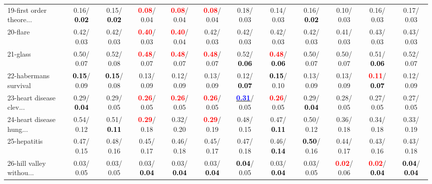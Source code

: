 \begin{table}[h]
\begin{center}
{\begin{tabular}{lc|c|c|c|c|c|c|c|c|c|c}
19-first order theore... &   0.16/\textcolor{black}{\textbf{  0.02}} &   0.15/\textcolor{black}{\textbf{  0.02}} & \textcolor{red}{\textbf{  0.08}}/  0.04 & \textcolor{red}{\textbf{  0.08}}/  0.04 & \textcolor{red}{\textbf{  0.08}}/  0.04 &   0.18/  0.03 &   0.14/  0.03 &   0.16/\textcolor{black}{\textbf{  0.02}} &   0.10/  0.03 &   0.16/  0.03 &   0.17/  0.03 \\
20-flare &   0.42/  0.03 &   0.42/  0.03 & \textcolor{red}{\textbf{  0.40}}/  0.03 & \textcolor{red}{\textbf{  0.40}}/  0.04 &   0.42/  0.03 &   0.42/  0.03 &   0.42/  0.03 &   0.42/  0.03 &   0.41/  0.03 &   0.43/  0.03 &   0.43/  0.03 \\
21-glass &   0.50/  0.07 &   0.52/  0.08 & \textcolor{red}{\textbf{  0.48}}/  0.07 & \textcolor{red}{\textbf{  0.48}}/  0.07 & \textcolor{red}{\textbf{  0.48}}/  0.07 &   0.52/\textcolor{black}{\textbf{  0.06}} & \textcolor{red}{\textbf{  0.48}}/\textcolor{black}{\textbf{  0.06}} &   0.50/  0.07 &   0.50/  0.07 &   0.51/\textcolor{black}{\textbf{  0.06}} &   0.52/  0.07 \\ \hline
22-habermans survival & \textcolor{black}{\textbf{  0.15}}/  0.09 & \textcolor{black}{\textbf{  0.15}}/  0.08 &   0.13/  0.09 &   0.12/  0.09 &   0.13/  0.09 &   0.12/\textcolor{black}{\textbf{  0.07}} & \textcolor{black}{\textbf{  0.15}}/  0.10 &   0.13/  0.09 &   0.13/  0.09 & \textcolor{red}{\textbf{  0.11}}/\textcolor{black}{\textbf{  0.07}} &   0.12/  0.09 \\
23-heart disease clev... &   0.29/\textcolor{black}{\textbf{  0.04}} &   0.29/  0.05 & \textcolor{red}{\textbf{  0.26}}/  0.05 & \textcolor{red}{\textbf{  0.26}}/  0.05 & \textcolor{red}{\textbf{  0.26}}/  0.05 & \underline{\textcolor{blue}{\textbf{  0.31}}}/  0.05 & \textcolor{red}{\textbf{  0.26}}/  0.05 &   0.29/\textcolor{black}{\textbf{  0.04}} &   0.28/  0.05 &   0.27/  0.05 &   0.27/  0.05 \\
24-heart disease hung... &   0.54/  0.12 &   0.51/\textcolor{black}{\textbf{  0.11}} & \textcolor{red}{\textbf{  0.29}}/  0.18 &   0.32/  0.20 & \textcolor{red}{\textbf{  0.29}}/  0.19 &   0.48/  0.15 &   0.47/\textcolor{black}{\textbf{  0.11}} &   0.50/  0.12 &   0.36/  0.18 &   0.34/  0.18 &   0.33/  0.19 \\
25-hepatitis &   0.47/  0.15 &   0.48/  0.16 &   0.45/  0.17 &   0.46/  0.18 &   0.45/  0.17 &   0.47/  0.18 &   0.46/\textcolor{black}{\textbf{  0.14}} & \textcolor{black}{\textbf{  0.50}}/  0.16 &   0.44/  0.17 &   0.43/  0.16 &   0.43/  0.18 \\
26-hill valley withou... &   0.03/  0.05 &   0.03/  0.05 &   0.03/\textcolor{black}{\textbf{  0.04}} &   0.03/\textcolor{black}{\textbf{  0.04}} &   0.03/\textcolor{black}{\textbf{  0.04}} & \textcolor{black}{\textbf{  0.04}}/  0.05 &   0.03/\textcolor{black}{\textbf{  0.04}} &   0.03/  0.05 & \textcolor{red}{\textbf{  0.02}}/  0.06 & \textcolor{red}{\textbf{  0.02}}/\textcolor{black}{\textbf{  0.04}} & \textcolor{black}{\textbf{  0.04}}/\textcolor{black}{\textbf{  0.04}} \\

\end{tabular}}
\end{center}
\end{table}
